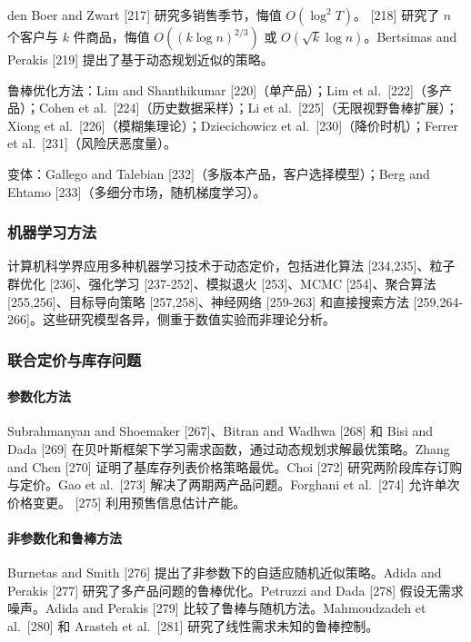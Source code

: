 den Boer and Zwart {[}217{]} 研究多销售季节，悔值 \(O(\log^2 T)\)。{ [}218{]} 研究了 \(n\) 个客户与 \(k\) 件商品，悔值 \(O((k\log n)^{2/3})\) 或 \(O(\sqrt{k}\log n)\)。Bertsimas and Perakis {[}219{]} 提出了基于动态规划近似的策略。

鲁棒优化方法：Lim and Shanthikumar {[}220{]}（单产品）；Lim et al.~{[}222{]}（多产品）；Cohen et al.~{[}224{]}（历史数据采样）；Li et al.~{[}225{]}（无限视野鲁棒扩展）；Xiong et al.~{[}226{]}（模糊集理论）；Dziecichowicz et al.~{[}230{]}（降价时机）；Ferrer et al.~{[}231{]}（风险厌恶度量）。

变体：Gallego and Talebian {[}232{]}（多版本产品，客户选择模型）；Berg and Ehtamo {[}233{]}（多细分市场，随机梯度学习）。

\subsubsection{机器学习方法}\label{machine-learning-approaches}

计算机科学界应用多种机器学习技术于动态定价，包括进化算法 {[}234,235{]}、粒子群优化 {[}236{]}、强化学习 {[}237-252{]}、模拟退火 {[}253{]}、MCMC {[}254{]}、聚合算法 {[}255,256{]}、目标导向策略 {[}257,258{]}、神经网络 {[}259-263{]} 和直接搜索方法 {[}259,264-266{]}。这些研究模型各异，侧重于数值实验而非理论分析。

\subsubsection{联合定价与库存问题}\label{joint-pricing-and-inventory-problems}

\paragraph{参数化方法}\label{parametric-approaches}

Subrahmanyan and Shoemaker {[}267{]}、Bitran and Wadhwa {[}268{]} 和 Bisi and Dada {[}269{]} 在贝叶斯框架下学习需求函数，通过动态规划求解最优策略。Zhang and Chen {[}270{]} 证明了基库存列表价格策略最优。Choi {[}272{]} 研究两阶段库存订购与定价。Gao et al.~{[}273{]} 解决了两期两产品问题。Forghani et al.~{[}274{]} 允许单次价格变更。{ [}275{]} 利用预售信息估计产能。

\paragraph{非参数化和鲁棒方法}\label{nonparametric-and-robust-approaches}

Burnetas and Smith {[}276{]} 提出了非参数下的自适应随机近似策略。Adida and Perakis {[}277{]} 研究了多产品问题的鲁棒优化。Petruzzi and Dada {[}278{]} 假设无需求噪声。Adida and Perakis {[}279{]} 比较了鲁棒与随机方法。Mahmoudzadeh et al.~{[}280{]} 和 Arasteh et al.~{[}281{]} 研究了线性需求未知的鲁棒控制。

